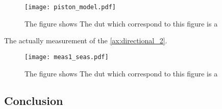 \begin{figure}[H]
	\centering
	\texttt{[image: piston\_model.pdf]}
	\caption{The figure shows  The \gls{dut} which correspond to this figure is a \citep{seas33}}
		\label{fig:piston_model_of_seas33}
\end{figure}

The actually measurement of the \citep{seas33}  \autoref{ax:directional_2}.

\begin{figure}[H]
	\centering
	\texttt{[image: meas1\_seas.pdf]}
	\caption{The figure shows  The \gls{dut} which correspond to this figure is a \citep{seas33}}
		\label{fig:piston_model_of_seas33}
\end{figure}

\subsection{Conclusion}